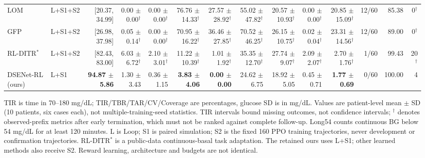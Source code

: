 \begin{table}[t]
{\begin{tabular}{llrrrrrrrrrrrr}
LOM & L+S1+S2 & [20.37, 34.99] & 0.00 $\pm$ 0.00$^{\dagger}$ & 0.00 $\pm$ 0.00$^{\dagger}$ & 76.76 $\pm$ 14.33$^{\dagger}$ & 27.57 $\pm$ 28.92$^{\dagger}$ & 55.02 $\pm$ 47.82$^{\dagger}$ & 20.57 $\pm$ 10.93$^{\dagger}$ & 0.00 $\pm$ 0.00$^{\dagger}$ & 20.85 $\pm$ 15.09$^{\dagger}$ & 12/60 & 85.38 & 0$^{\dagger}$ \\
GFP & L+S1+S2 & [26.98, 37.98] & 0.05 $\pm$ 0.14$^{\dagger}$ & 0.00 $\pm$ 0.00$^{\dagger}$ & 70.95 $\pm$ 16.22$^{\dagger}$ & 36.46 $\pm$ 27.85$^{\dagger}$ & 70.52 $\pm$ 46.25$^{\dagger}$ & 26.15 $\pm$ 10.75$^{\dagger}$ & 0.02 $\pm$ 0.04$^{\dagger}$ & 23.31 $\pm$ 14.56$^{\dagger}$ & 12/60 & 89.00 & 0$^{\dagger}$ \\
RL-DITR$^{*}$ & L+S1+S2 & [82.43, 83.00] & 6.03 $\pm$ 6.72$^{\dagger}$ & 2.10 $\pm$ 3.01$^{\dagger}$ & 11.22 $\pm$ 10.39$^{\dagger}$ & 1.01 $\pm$ 1.92$^{\dagger}$ & 35.35 $\pm$ 12.70$^{\dagger}$ & 27.74 $\pm$ 9.07$^{\dagger}$ & 2.09 $\pm$ 2.07$^{\dagger}$ & 2.70 $\pm$ 1.76$^{\dagger}$ & 1/60 & 99.43 & 20$^{\dagger}$ \\
DSENet-RL (ours) & L+S1 & \textbf{94.87 $\pm$ 5.86} & 1.30 $\pm$ 3.43 & 0.36 $\pm$ 1.15 & \textbf{3.83 $\pm$ 4.06} & \textbf{0.00 $\pm$ 0.00} & 24.62 $\pm$ 6.75 & 18.92 $\pm$ 5.05 & 0.45 $\pm$ 0.71 & \textbf{1.77 $\pm$ 0.69} & 0/60 & 100.00 & 4 \\
\bottomrule
\end{tabular}}
\par\smallskip\raggedright\footnotesize
TIR is time in 70--180 mg/dL; TIR/TBR/TAR/CV/Coverage are percentages, glucose SD is in mg/dL. Values are patient-level mean $\pm$ SD (10 patients, six cases each), not multiple-training-seed statistics. TIR intervals bound missing outcomes, not confidence intervals; $^{\dagger}$ denotes observed-prefix metrics after early termination, which must not be ranked against complete follow-up. Long54 counts continuous BG below 54 mg/dL for at least 120 minutes. L is Loop; S1 is paired simulation; S2 is the fixed 160 PPO training trajectories, never development or confirmation trajectories. RL-DITR$^*$ is a public-data continuous-basal task adaptation. The retained ours uses L+S1; other learned methods also receive S2. Reward learning, architecture and budgets are not identical.
\end{table}
